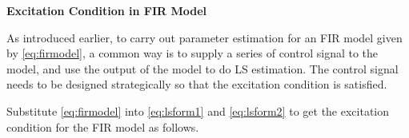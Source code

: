 \vspace{0.1in}
\noindent \textbf{Excitation Condition in FIR Model}
\vspace{0.1in}

As introduced earlier, to carry out parameter estimation for an FIR model given by \eqref{eq:firmodel}, a common way is to supply a series of control signal to the model, and use the output of the model to do LS estimation. The control signal needs to be designed strategically so that the excitation condition is satisfied.

Substitute \eqref{eq:firmodel} into \eqref{eq:lsform1} and \eqref{eq:lsform2} to get the excitation condition for the FIR model as follows.









